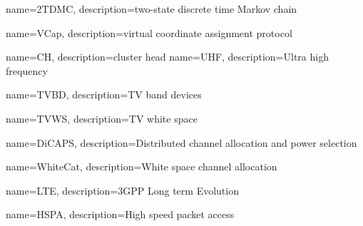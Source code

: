 {
    name=2TDMC,
    description={two-state discrete time Markov chain}
}

{
    name=VCap,
    description={virtual coordinate assignment protocol}
}


{
    name=CH,
    description={cluster head}
}
{
    name=UHF,
    description={Ultra high frequency}
}


{
    name=TVBD,
    description={TV band devices}
}

{
    name=TVWS,
    description={TV white space}
}

{
    name=DiCAPS,
    description={Distributed channel allocation and power selection}
}

{
    name=WhiteCat,
    description={White space channel allocation}
}

{
    name=LTE,
    description={3GPP Long term Evolution}
}

{
    name=HSPA,
    description={High speed packet access}
}
